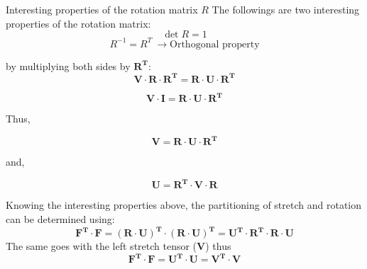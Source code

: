 \begin{keyconcept}{Interesting properties of the rotation matrix $R$}
    The followings are two interesting properties of the rotation matrix:
    \begin{equation}
        \det{R} = 1
    \end{equation}
    \begin{equation}
        R^{-1} = R^T \ \rightarrow \text{Orthogonal property}
    \end{equation}
 
\end{keyconcept}

by multiplying both sides by $\mathbf{R^T}$:
\begin{equation}
    \mathbf{V \cdot R \cdot R^T = R \cdot U \cdot R^T}
\end{equation}

\begin{equation}
    \mathbf{V \cdot I = R \cdot U \cdot R^T}
\end{equation}

Thus, 

\begin{equation}
    \mathbf{V = R \cdot U \cdot R^T}
\end{equation}

and,

\begin{equation}
    \mathbf{U = R^T \cdot V \cdot R}
\end{equation}

Knowing the interesting properties above, the partitioning of stretch and rotation can be determined using:
\begin{equation}
    \mathbf{F^T \cdot F = ( R\cdot U )^T \cdot ( R\cdot U )^T}=\mathbf{U^T \cdot R^T \cdot R \cdot U}
\end{equation}
The same goes with the left stretch tensor ($\mathbf{V}$) thus
\begin{equation}
    \label{eq:gradienttransposeproperty}
    \mathbf{F^T \cdot F = U^T \cdot U = V^T\cdot V}
\end{equation}

